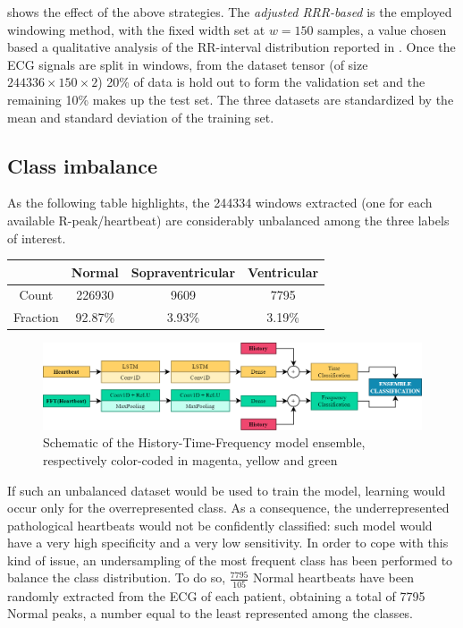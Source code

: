 \documentclass[conference]{IEEEtran}
\begin{document}
     shows the effect of the above strategies. The
    \textit{adjusted RRR-based} is the employed windowing method, with
    the fixed width set at $w = 150$ samples, a value chosen based a
    qualitative analysis of the RR-interval distribution reported in
    . Once the ECG signals are split in windows, from
    the dataset tensor (of size $244336\times 150 \times 2$) 20\% of
    data is hold out to form the validation set and the remaining 10\%
    makes up the test set. The three datasets are standardized by the
    mean and standard deviation of the training set.     

\subsection{Class imbalance}
    As the following table highlights, the 244334 windows extracted
    (one for each available R-peak/heartbeat) are considerably
    unbalanced among the three labels of interest.
    \begin{center}
        \begin{tabular}{||c |c c c||}
            \hline
            & Normal & Sopraventricular & Ventricular \\
            \hline \hline
            Count & 226930 & 9609 & 7795 \\
            \hline
            Fraction & 92.87\% & 3.93\% & 3.19\% \\
            \hline
        \end{tabular}
    \end{center}

    
    \begin{figure}
        \centering
        \includegraphics{img/model.png}
        \caption{Schematic of the History-Time-Frequency model
        ensemble, respectively color-coded in magenta, yellow and
        green}
        \label{fig:model}
    \end{figure}

    If such an unbalanced dataset would be used to train the model,
    learning would occur only for the overrepresented class. As a
    consequence, the underrepresented pathological heartbeats would
    not be confidently classified: such model would have a very high
    specificity and a very low sensitivity. In order to cope with this
    kind of issue, an undersampling of the most frequent class has
    been performed to balance the class distribution. To do so,
    $\frac{7795}{105}$ Normal heartbeats have been randomly extracted
    from the ECG of each patient, obtaining a total of 7795 Normal
    peaks, a number equal to the least represented among the classes.
\end{document}
